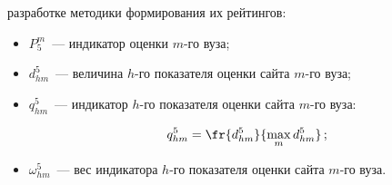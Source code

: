 разработке методики формирования их рейтингов:


\begin{itemize}


\item


$P_5^m$~--- индикатор оценки $m$-го вуза;


\item $d^5_{hm}$~--- величина $h$-го показателя оценки сайта $m$-го вуза; 


\item $q^5_{hm}$~--- индикатор $h$-го показателя оценки сайта $m$-го вуза:


$$


q^5_{hm}= \fr{d^5_{hm}}{\max_m d^5_{hm}}\,;


$$ 


\item $\omega^5_{hm}$~--- вес индикатора $h$-го показателя оценки сайта $m$-го вуза.


\end{itemize}





